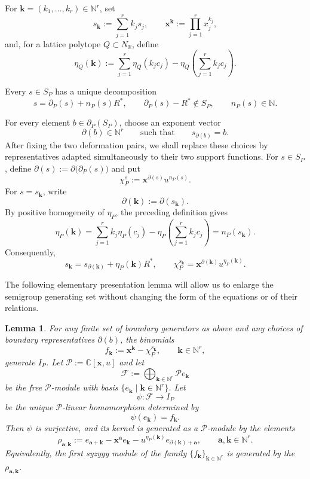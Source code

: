 \documentclass[11pt]{amsart}
\numberwithin{equation}{section}
\theoremstyle{plain}
\newtheorem{lemma}[theorem]{Lemma}
\theoremstyle{definition}
\newcommand{\0}{$0$-mutable}
\newcommand{\NN}{\ensuremath{\mathbb{N}}}
\newcommand{\RR}{\ensuremath{\mathbb{R}}}
\newcommand{\CC}{\ensuremath{\mathbb{C}}}
\newcommand{\bfa}{\ensuremath{\mathbf{a}}}
\newcommand{\bfk}{\ensuremath{\mathbf{k}}}
\newcommand{\bfx}{\ensuremath{\mathbf{x}}}
\renewcommand{\1}{$1$-rigid}
\renewcommand{\0}{$0$-mutable}
\begin{document}
For \(\bfk=(k_1,\ldots,k_r)\in\NN^r\), set
\[
s_{\bfk}:=\sum_{j=1}^r k_js_j,
\qquad
\bfx^{\bfk}:=\prod_{j=1}^r x_j^{k_j},
\]
and, for a lattice polytope \(Q\subset N_{\RR}\), define
\[
\eta_Q(\bfk)
:=
\sum_{j=1}^r\eta_Q(k_jc_j)
-
\eta_Q\left(\sum_{j=1}^r k_jc_j\right).
\]

Every \(s\in S_P\) has a unique decomposition
\[
s=\partial_P(s)+n_P(s)R^*,
\qquad
\partial_P(s)-R^*\notin S_P,
\qquad
n_P(s)\in\NN.
\]





For every element \(b\in\partial_P(S_P)\), choose an exponent vector
\[
\partial(b)\in\mathbb N^r
\qquad\text{such that}\qquad
s_{\partial(b)}=b.
\]
After fixing the two deformation pairs, we shall replace these choices
by representatives adapted simultaneously to their two support
functions.
For \(s\in S_P\), define
$
\partial(s):=\partial\bigl(\partial_P(s)\bigr) 
$ 
and put
\[
\chi_P^s:=\bfx^{\partial(s)}u^{n_P(s)}.
\]
{
For \(s=s_{\bfk}\), write
\[
\partial(\bfk):=\partial(s_{\bfk}).
\]
By positive homogeneity of \(\eta_P\), the preceding definition gives
\[
\eta_P(\bfk)
=
\sum_{j=1}^r k_j\eta_P(c_j)
-
\eta_P\left(\sum_{j=1}^r k_jc_j\right)
=
n_P(s_{\bfk}).
\]
Consequently,
\[
s_{\bfk}
=
s_{\partial(\bfk)}+\eta_P(\bfk)R^*,
\qquad
\chi_P^{s_{\bfk}}
=
\bfx^{\partial(\bfk)}u^{\eta_P(\bfk)}.
\]
}



The following elementary presentation lemma will allow us to enlarge the
semigroup generating set without changing the form of the equations or
of their relations.

\begin{lemma}\label{lem presentation arbitrary generators}
For any finite set of boundary generators as above and any choices of
boundary representatives \(\partial(b)\), the binomials
\[
f_{\bfk}
:=
\bfx^{\bfk}-\chi_P^{s_{\bfk}},
\qquad
\bfk\in\NN^r,
\]
generate \(I_P\). 
{Let
$
\mathcal P:=\CC[\bfx,u]
$
and let
\[
\mathcal F
:=
\bigoplus_{\bfk\in\NN^r}\mathcal P e_{\bfk}
\]
be the free \(\mathcal P\)-module with basis
\(\{e_{\bfk}\mid\bfk\in\NN^r\}\). Let
\[
\psi\colon\mathcal F\longrightarrow I_P
\]
be the unique \(\mathcal P\)-linear homomorphism determined by
\[
\psi(e_{\bfk})=f_{\bfk}.
\]
Then \(\psi\) is surjective, and its kernel is generated as a
\(\mathcal P\)-module by the elements
\[
\rho_{\bfa,\bfk}
:=
e_{\bfa+\bfk}
-
\bfx^{\bfa}e_{\bfk}
-
u^{\eta_P(\bfk)}
e_{\partial(\bfk)+\bfa},
\qquad
\bfa,\bfk\in\NN^r.
\]
Equivalently, the first syzygy module of the family
\(\{f_{\bfk}\}_{\bfk\in\NN^r}\) is generated by the
\(\rho_{\bfa,\bfk}\).
}
\end{lemma}
\end{document}

